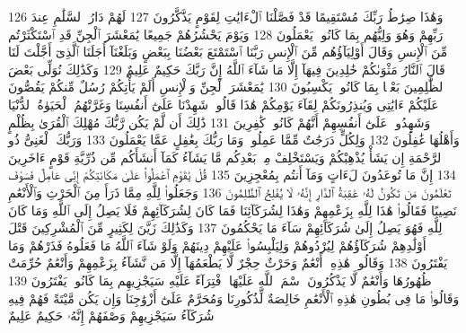 {\tiny\colorbox{cl_aya}{126}} وَهَٰذَا صِرَٰطُ رَبِّكَ مُسْتَقِيمًا قَدْ فَصَّلْنَا ٱلْءَايَٰتِ لِقَوْمٍ يَذَّكَّرُونَ
{\tiny\colorbox{cl_aya}{127}} لَهُمْ دَارُ ٱلسَّلَٰمِ عِندَ رَبِّهِمْ وَهُوَ وَلِيُّهُم بِمَا كَانُوا۟ يَعْمَلُونَ
{\tiny\colorbox{cl_aya}{128}} وَيَوْمَ يَحْشُرُهُمْ جَمِيعًا يَٰمَعْشَرَ ٱلْجِنِّ قَدِ ٱسْتَكْثَرْتُم مِّنَ ٱلْإِنسِ وَقَالَ أَوْلِيَآؤُهُم مِّنَ ٱلْإِنسِ رَبَّنَا ٱسْتَمْتَعَ بَعْضُنَا بِبَعْضٍ وَبَلَغْنَآ أَجَلَنَا ٱلَّذِىٓ أَجَّلْتَ لَنَا قَالَ ٱلنَّارُ مَثْوَىٰكُمْ خَٰلِدِينَ فِيهَآ إِلَّا مَا شَآءَ ٱللَّهُ إِنَّ رَبَّكَ حَكِيمٌ عَلِيمٌ
{\tiny\colorbox{cl_aya}{129}} وَكَذَٰلِكَ نُوَلِّى بَعْضَ ٱلظَّٰلِمِينَ بَعْضًۢا بِمَا كَانُوا۟ يَكْسِبُونَ
{\tiny\colorbox{cl_aya}{130}} يَٰمَعْشَرَ ٱلْجِنِّ وَٱلْإِنسِ أَلَمْ يَأْتِكُمْ رُسُلٌ مِّنكُمْ يَقُصُّونَ عَلَيْكُمْ ءَايَٰتِى وَيُنذِرُونَكُمْ لِقَآءَ يَوْمِكُمْ هَٰذَا قَالُوا۟ شَهِدْنَا عَلَىٰٓ أَنفُسِنَا وَغَرَّتْهُمُ ٱلْحَيَوٰةُ ٱلدُّنْيَا وَشَهِدُوا۟ عَلَىٰٓ أَنفُسِهِمْ أَنَّهُمْ كَانُوا۟ كَٰفِرِينَ
{\tiny\colorbox{cl_aya}{131}} ذَٰلِكَ أَن لَّمْ يَكُن رَّبُّكَ مُهْلِكَ ٱلْقُرَىٰ بِظُلْمٍ وَأَهْلُهَا غَٰفِلُونَ
{\tiny\colorbox{cl_aya}{132}} وَلِكُلٍّ دَرَجَٰتٌ مِّمَّا عَمِلُوا۟ وَمَا رَبُّكَ بِغَٰفِلٍ عَمَّا يَعْمَلُونَ
{\tiny\colorbox{cl_aya}{133}} وَرَبُّكَ ٱلْغَنِىُّ ذُو ٱلرَّحْمَةِ إِن يَشَأْ يُذْهِبْكُمْ وَيَسْتَخْلِفْ مِنۢ بَعْدِكُم مَّا يَشَآءُ كَمَآ أَنشَأَكُم مِّن ذُرِّيَّةِ قَوْمٍ ءَاخَرِينَ
{\tiny\colorbox{cl_aya}{134}} إِنَّ مَا تُوعَدُونَ لَءَاتٍ وَمَآ أَنتُم بِمُعْجِزِينَ
{\tiny\colorbox{cl_aya}{135}} قُلْ يَٰقَوْمِ ٱعْمَلُوا۟ عَلَىٰ مَكَانَتِكُمْ إِنِّى عَامِلٌ فَسَوْفَ تَعْلَمُونَ مَن تَكُونُ لَهُۥ عَٰقِبَةُ ٱلدَّارِ إِنَّهُۥ لَا يُفْلِحُ ٱلظَّٰلِمُونَ
{\tiny\colorbox{cl_aya}{136}} وَجَعَلُوا۟ لِلَّهِ مِمَّا ذَرَأَ مِنَ ٱلْحَرْثِ وَٱلْأَنْعَٰمِ نَصِيبًا فَقَالُوا۟ هَٰذَا لِلَّهِ بِزَعْمِهِمْ وَهَٰذَا لِشُرَكَآئِنَا فَمَا كَانَ لِشُرَكَآئِهِمْ فَلَا يَصِلُ إِلَى ٱللَّهِ وَمَا كَانَ لِلَّهِ فَهُوَ يَصِلُ إِلَىٰ شُرَكَآئِهِمْ سَآءَ مَا يَحْكُمُونَ
{\tiny\colorbox{cl_aya}{137}} وَكَذَٰلِكَ زَيَّنَ لِكَثِيرٍ مِّنَ ٱلْمُشْرِكِينَ قَتْلَ أَوْلَٰدِهِمْ شُرَكَآؤُهُمْ لِيُرْدُوهُمْ وَلِيَلْبِسُوا۟ عَلَيْهِمْ دِينَهُمْ وَلَوْ شَآءَ ٱللَّهُ مَا فَعَلُوهُ فَذَرْهُمْ وَمَا يَفْتَرُونَ
{\tiny\colorbox{cl_aya}{138}} وَقَالُوا۟ هَٰذِهِۦٓ أَنْعَٰمٌ وَحَرْثٌ حِجْرٌ لَّا يَطْعَمُهَآ إِلَّا مَن نَّشَآءُ بِزَعْمِهِمْ وَأَنْعَٰمٌ حُرِّمَتْ ظُهُورُهَا وَأَنْعَٰمٌ لَّا يَذْكُرُونَ ٱسْمَ ٱللَّهِ عَلَيْهَا ٱفْتِرَآءً عَلَيْهِ سَيَجْزِيهِم بِمَا كَانُوا۟ يَفْتَرُونَ
{\tiny\colorbox{cl_aya}{139}} وَقَالُوا۟ مَا فِى بُطُونِ هَٰذِهِ ٱلْأَنْعَٰمِ خَالِصَةٌ لِّذُكُورِنَا وَمُحَرَّمٌ عَلَىٰٓ أَزْوَٰجِنَا وَإِن يَكُن مَّيْتَةً فَهُمْ فِيهِ شُرَكَآءُ سَيَجْزِيهِمْ وَصْفَهُمْ إِنَّهُۥ حَكِيمٌ عَلِيمٌ
